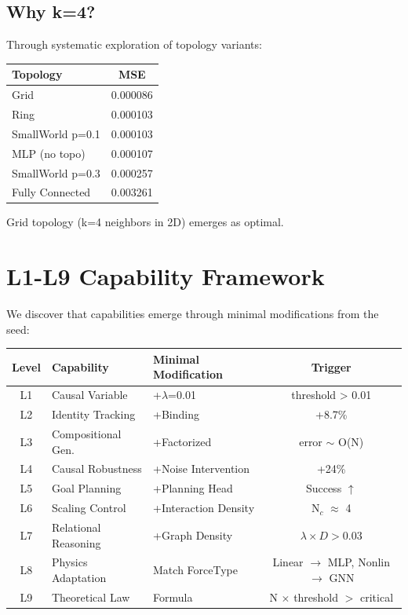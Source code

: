 \documentclass{article}
\begin{document}
\subsection{Why k=4?}
Through systematic exploration of topology variants:
\begin{center}
\begin{tabular}{l|c}
Topology & MSE \\
\hline
Grid & 0.000086 \\
Ring & 0.000103 \\
SmallWorld p=0.1 & 0.000103 \\
MLP (no topo) & 0.000107 \\
SmallWorld p=0.3 & 0.000257 \\
Fully Connected & 0.003261 \\
\end{tabular}
\end{center}

Grid topology (k=4 neighbors in 2D) emerges as optimal.

\section{L1-L9 Capability Framework}

We discover that capabilities emerge through minimal modifications from the seed:

\begin{center}
\begin{tabular}{c|l|l|c}
Level & Capability & Minimal Modification & Trigger \\
\hline
L1 & Causal Variable & +$\lambda$=0.01 & threshold > 0.01 \\
L2 & Identity Tracking & +Binding & +8.7\% \\
L3 & Compositional Gen. & +Factorized & error $\sim$ O(N) \\
L4 & Causal Robustness & +Noise Intervention & +24\% \\
L5 & Goal Planning & +Planning Head & Success $\uparrow$ \\
L6 & Scaling Control & +Interaction Density & N$_c$ $\approx$ 4 \\
L7 & Relational Reasoning & +Graph Density & $\lambda \times D > 0.03$ \\
L8 & Physics Adaptation & Match ForceType & Linear $\to$ MLP, Nonlin $\to$ GNN \\
L9 & Theoretical Law & Formula & N $\times$ threshold $>$ critical \\
\end{tabular}
\end{center}
\end{document}
